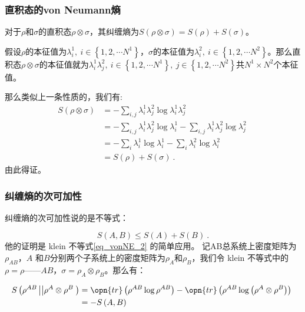 \subsubsection{直积态的von Neumann熵}

对于$\rho$和$\sigma$的直积态$\rho\otimes\sigma$，其纠缠熵为$S\left(\rho\otimes \sigma\right) = S\left(\rho\right) + S\left(\sigma\right)$。

假设$\rho$的本征值为$\lambda_i^1,~i\in \left\{1,2,\cdots N^1\right\}$，$\sigma$的本征值为$\lambda_i^2,~i \in \left\{1,2,\cdots N^2\right\}$。那么直积态$\rho\otimes \sigma$的本征值就为$\lambda_i^1\lambda_j^2,~i\in\left\{1,2,\cdots N^1\right\},~j\in\left\{1,2,\cdots N^2\right\}$共$N^1\times N^2$个本征值。

那么类似上一条性质的，我们有:
\begin{equation}
\begin{aligned}
S\left(\rho\otimes\sigma\right) &= -\sum_{i,j}\lambda_i^1\lambda_j^2\log\lambda_i^1\lambda_j^2 \\
&= -\sum_{i,j}\lambda_i^1\lambda_j^2\log\lambda_i^1 - \sum_{i,j}\lambda_i^1\lambda_j^2\log\lambda_j^2 \\
&= -\sum_i \lambda_i^1\log\lambda_i^1 - \sum_i\lambda_i^2\log\lambda_i^2 \\
&= S\left(\rho\right) + S\left(\sigma\right)~.
\end{aligned}~
\end{equation}
由此得证。

\subsubsection{纠缠熵的次可加性}

纠缠熵的次可加性说的是不等式：

\begin{equation}
S\left(A,B\right) \leqslant S\left(A\right) + S\left(B\right) ~.
\end{equation}
他的证明是 klein 不等式\autoref{eq_vonNE_2} 的简单应用。 记AB总系统上密度矩阵为$\rho_{AB}$，$A$
和$B$分别两个子系统上的密度矩阵为$\rho_A$和$\rho_B$，我们令 klein 不等式中的$\rho = \rho——{AB}$，$\sigma = \rho_A\otimes \rho_B$。那么有：

\begin{equation}
\begin{aligned}
S\left(\rho^{AB}\left|\left|\rho^A\otimes\rho^B\right.\right.\right)&= \opn{tr}\left(\rho^{AB}\log\rho^{AB}\right) - \opn{tr}\left(\rho^{AB}\log\left(\rho^A\otimes\rho^B\right)\right) \\
&= -S\left(A,B\right)
\end{aligned}~
\end{equation}


